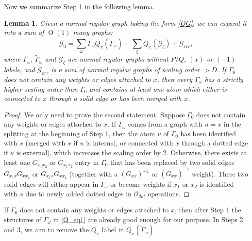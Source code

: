 \documentclass{article}
\newcommand{\1}{\mathds{1}}
\numberwithin{equation}{section}
\newcommand{\be}{\begin{equation}}
\newcommand{\ee}{\end{equation}}
\renewcommand{\cal}{\mathcal}
\newcommand{\wt}{\widetilde}
\DeclareMathOperator{\OO}{O}
\theoremstyle{plain} %
\newtheorem{lemma}[theorem]{Lemma}
\theoremstyle{remark}
\newcommand{\cor}{\color{red}}
\newcommand{\hty}[1]{{\cor (ht: #1) }}
\begin{document}
Now we summarize Step 1 in the following lemma. 
\begin{lemma}\label{Q_lemma1}
Given a normal regular graph taking the form \eqref{QG}, we can expand it into a sum of $\OO(1)$ many graphs: %
\be\label{Q_eq1}\cal G_0 = \sum_{\omega} \Gamma_\omega Q_x(\wt \Gamma_{\omega}) + \sum_{\zeta} Q_x \left( \cal G_\zeta \right) + \cal G_{err},\ee
where $\Gamma_{\omega}$, $\wt \Gamma_{\omega}$ and $\cal G_\zeta $ are normal regular graphs without $P/Q$, ${(x)}$ or $(-1)$ labels, and $\cal G_{err}$ is a sum of normal regular graphs of scaling order $>D$.  %
If $\Gamma_0$ does not contain any weights or edges attached to $x$, then every $\Gamma_\omega$ has a strictly higher scaling order than $\Gamma_0$ and contains at least one atom which either is connected to $x$ through a solid edge or has been merged with $x$.

\end{lemma}
\begin{proof} 
We only need to prove the second statement. Suppose $\Gamma_0$ does not contain any weights or edges attached to $x$. If $\Gamma_\omega$ comes from a graph with $u=x$ in the splitting at the beginning of Step 1, then the atom $u$ of $\Gamma_0$ has been identified with $x$ (merged with $x$ if $u$ is internal, or connected with $x$ through a dotted edge if $u$ is external), which increases the scaling order by $2$. Otherwise, there exists at least one $G_{x_1x_2}$ or $\overline G_{x_1x_2}$ entry in $\Gamma_0$ that has been replaced by two solid edges $G_{x_1 x}G_{xx_2}$ or $\overline G_{x_1 x}\overline G_{x x_2}$ (together with a $(G_{xx})^{-1}$ or $(\overline G_{xx})^{-1}$ weight). These two solid edges will either appear in $\Gamma_{\omega}$ or become weights if $x_1$ or $x_2$ is identified with $x$ due to newly added dotted edges in $\cal O_{dot}$ operations. 
\end{proof}
If $\Gamma_0$ does not contain any weights or edges attached to $x$, then after Step 1 the structures of $\Gamma_\omega$ in \eqref{Q_eq1} are already good enough for our purpose. In Steps 2 and 3, we aim to remove the $Q_x$ label in $Q_x(\wt \Gamma_{\omega})$.
\end{document}
